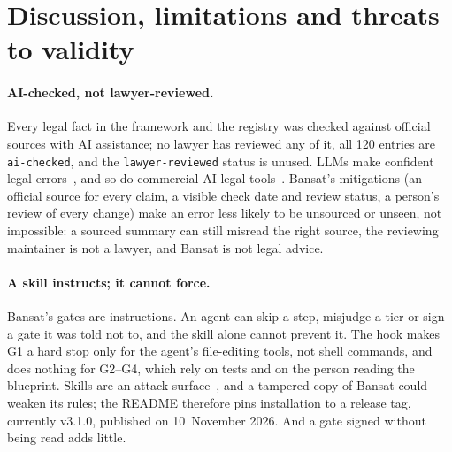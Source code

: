 \documentclass[11pt,a4paper]{article}
\begin{document}
\section{Discussion, limitations and threats to validity}\label{sec:discussion}

\paragraph{AI-checked, not lawyer-reviewed.}
Every legal fact in the framework and the registry was checked against official sources with AI assistance; no lawyer
has reviewed any of it, all 120 entries are \texttt{ai-checked}, and the \texttt{lawyer-reviewed} status is unused. LLMs
make confident legal errors~\cite{dahl2024fictions}, and so do commercial AI legal tools~\cite{magesh2025hallucination}.
Bansat's mitigations (an official source for every claim, a visible check date and review status, a person's review of
every change) make an error less likely to be unsourced or unseen, not impossible: a sourced summary can still misread
the right source, the reviewing maintainer is not a lawyer, and Bansat is not legal advice.

\paragraph{A skill instructs; it cannot force.}
Bansat's gates are instructions. An agent can skip a step, misjudge a tier or sign a gate it was told not to, and the
skill alone cannot prevent it. The hook makes G1 a hard stop only for the agent's file-editing tools, not shell commands, and
does nothing for G2--G4, which rely on tests and on the person reading the blueprint. Skills are an attack
surface~\cite{li2026secureskills,liu2026skillswild}, and a tampered copy of Bansat could weaken its rules; the README
therefore pins installation to a release tag, currently v3.1.0, published on 10~November 2026. And a gate signed without
being read adds little.
\end{document}

